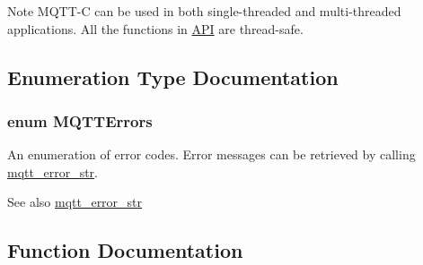 \begin{DoxyNote}{Note}
M\+Q\+T\+T-\/C can be used in both single-\/threaded and multi-\/threaded applications. All the functions in \hyperlink{group__api}{A\+PI} are thread-\/safe. 
\end{DoxyNote}


\subsection{Enumeration Type Documentation}
\subsubsection[{\texorpdfstring{M\+Q\+T\+T\+Errors}{MQTTErrors}}]{\setlength{\rightskip}{0pt plus 5cm}enum {\bf M\+Q\+T\+T\+Errors}}\hypertarget{group__api_gad0c901a8d30691ed0ca17915b691b7e7}{}\label{group__api_gad0c901a8d30691ed0ca17915b691b7e7}


An enumeration of error codes. Error messages can be retrieved by calling \hyperlink{group__api_ga47b62bdd24e8b05957825d2419d7c848}{mqtt\+\_\+error\+\_\+str}. 

\begin{DoxySeeAlso}{See also}
\hyperlink{group__api_ga47b62bdd24e8b05957825d2419d7c848}{mqtt\+\_\+error\+\_\+str} 
\end{DoxySeeAlso}


\subsection{Function Documentation}
